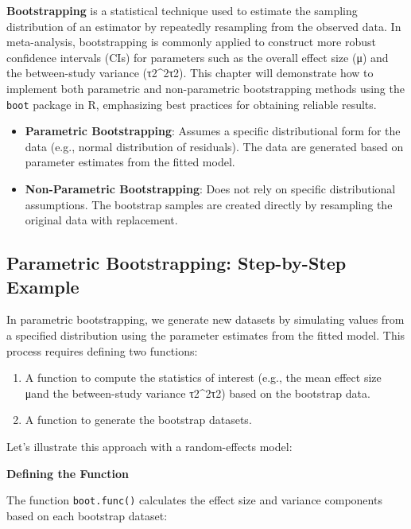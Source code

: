 \documentclass[
]{book}
\begin{document}
\textbf{Bootstrapping} is a statistical technique used to estimate the sampling distribution of an estimator by repeatedly resampling from the observed data. In meta-analysis, bootstrapping is commonly applied to construct more robust confidence intervals (CIs) for parameters such as the overall effect size (μ) and the between-study variance (τ2\tau\^{}2τ2). This chapter will demonstrate how to implement both parametric and non-parametric bootstrapping methods using the \texttt{boot} package in R, emphasizing best practices for obtaining reliable results.

\begin{itemize}
\item
  \textbf{Parametric Bootstrapping}: Assumes a specific distributional form for the data (e.g., normal distribution of residuals). The data are generated based on parameter estimates from the fitted model.
\item
  \textbf{Non-Parametric Bootstrapping}: Does not rely on specific distributional assumptions. The bootstrap samples are created directly by resampling the original data with replacement.
\end{itemize}

\subsection{Parametric Bootstrapping: Step-by-Step Example}\label{parametric-bootstrapping-step-by-step-example}

In parametric bootstrapping, we generate new datasets by simulating values from a specified distribution using the parameter estimates from the fitted model. This process requires defining two functions:

\begin{enumerate}
\def\labelenumi{\arabic{enumi}.}
\item
  A function to compute the statistics of interest (e.g., the mean effect size μ and the between-study variance τ2\tau\^{}2τ2) based on the bootstrap data.
\item
  A function to generate the bootstrap datasets.
\end{enumerate}

Let's illustrate this approach with a random-effects model:

\textbf{Defining the Function}

The function \texttt{boot.func()} calculates the effect size and variance components based on each bootstrap dataset:
\end{document}
